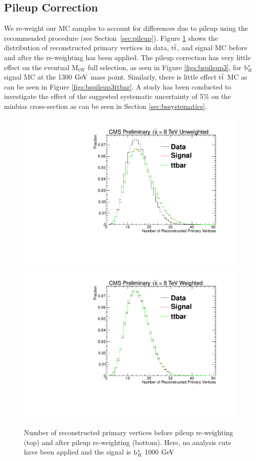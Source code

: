 \subsection{Pileup Correction}
\label{sec:bspileup}
We re-weight our MC samples to account for differences due to pileup using the recommended procedure (see Section~\ref{sec:pileup}).  
Figure \ref{figs:bsnpvweight} shows the distribution of reconstructed primary vertices in data, $\mathrm{t\overline{t}}$,
and signal MC before and after the re-weighting has been applied. The pileup correction has very little effect on the eventual $\mathrm{M_{tW}}$ 
full selection, as 
seen in Figure \ref{figs:bspileup3}, for $\mathrm{b}^{*}_R$ signal MC at the 1300$~\mathrm{GeV}$ mass point. Similarly, there is little effect 
$\mathrm{t\overline{t}}$ MC as can be seen in Figure \ref{figs:bspileup3ttbar}.  
A study has been conducted to investigate the effect of the suggested systematic uncertainty of 5\% on the minbias cross-section as can be seen in Section \ref{sec:bssystematics}.  


\begin{figure}
\begin{center}
\includegraphics[width=0.7\linewidth]{AN-14-049/figs/npvuw.pdf}\\
\includegraphics[width=0.7\linewidth]{AN-14-049/figs/npvw.pdf}
\end{center}
\caption{Number of reconstructed primary vertices before pileup re-weighting (top) and after pileup re-weighting (bottom).  Here, no analysis cuts have been applied and the signal is $\mathrm{b}^{*}_R$ 1000$~\mathrm{GeV}$}
\label{figs:bsnpvweight}
\end{figure}

